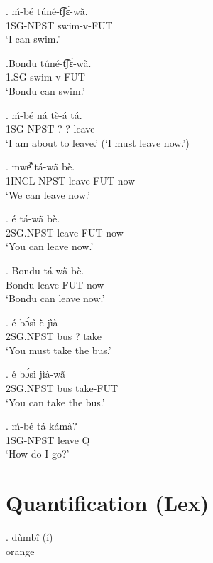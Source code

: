 \documentclass{assets/fieldnotes}
\begin{document}
{\exg. ḿ-bé túné-t͡ʃɛ̀-wã̀.\\
    1SG-NPST swim-v-FUT\\
    `I can swim.'

\exg.Bondu túné-t͡ʃɛ̀-wã̀.\\
    1.SG swim-v-FUT\\
    `Bondu can swim.'

\par
{}
\exg. ḿ-bé ná tè-á tá.\\
    1SG-NPST ? ? leave\\
    `I am about to leave.' (`I must leave now.')

\exg. mwe᷈̂ tá-wã̀ bè.\\
    1INCL-NPST leave-FUT now\\
    `We can leave now.'

\exg. é tá-wã̀ bè.\\
    2SG.NPST leave-FUT now\\
    `You can leave now.'

\exg. Bondu tá-wã̀ bè.\\
    Bondu leave-FUT now\\
    `Bondu can leave now.'

\par
{}
\exg. é bɔ́sì ẽ̀ jìà\\
    2SG.NPST bus ? take\\
    `You must take the bus.'

\exg. é bɔ́sì jìà-wã\\
    2SG.NPST bus take-FUT\\
    `You can take the bus.'

\exg. ḿ-bé tá kámà?\\
    1SG-NPST leave Q\\
    `How do I go?'

\section{Quantification (Lex)} 


\exg. dùmbî (í)\\ 
orange\\

}
\end{document}
